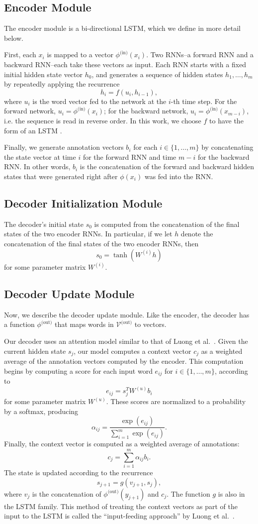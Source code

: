 \documentclass[11pt,letterpaper]{article}
\newcommand{\phiin}{\phi^{\text{(in)}}}
\newcommand{\vocabout}{\mathcal{V}^{\text{(out)}}}
\newcommand{\phiout}{\phi^{\text{(out)}}}
\begin{document}
\subsection{Encoder Module}
The encoder module is a bi-directional LSTM, which we define
in more detail below.

First, each $x_i$ is mapped to a vector $\phiin(x_i)$.
Two RNNs--a forward RNN and a backward RNN--each take these vectors as input.
Each RNN starts with a fixed initial hidden state vector $h_0$, and 
generates a sequence of hidden states $h_1, \dotsc, h_m$ by
repeatedly applying the recurrence \[
  h_i = f(u_i, h_{i-1}),
\]
where $u_i$ is the word vector fed to the network at the $i$-th time step.
For the forward network, $u_i = \phiin(x_i)$; for the
backward network, $u_i = \phiin(x_{m-i})$, i.e. the sequence is read in reverse order.
In this work, we choose $f$ to have the form of an LSTM \cite{hochreiter1997lstm}.

Finally, we generate annotation vectors $b_i$ for each 
$i \in \{1, \dotsc, m\}$ by concatenating the 
state vector at time $i$ for the forward RNN and time $m-i$ 
for the backward RNN.  
In other words, $b_i$ is the concatenation of the forward
and backward hidden states that were generated
right after $\phi(x_i)$ was fed into the RNN.

\subsection{Decoder Initialization Module}
The decoder's initial state $s_0$ is computed from 
the concatenation of the final states of the two encoder RNNs.
In particular, if we let $h$ denote the
concatenation of the final states of the two encoder RNNs, then
\[
  s_0 = \tanh(W^{(i)} h)
\]
for some parameter matrix $W^{(i)}$.

\subsection{Decoder Update Module}
Now, we describe the decoder update module.
Like the encoder, the decoder has a function $\phiout$
that maps words in $\vocabout$ to vectors.

Our decoder uses an attention model similar to that of 
Luong et al.~.
Given the current hidden state $s_j$, our model computes
a context vector $c_j$ as a weighted average of the annotation vectors
computed by the encoder.
This computation begins by computing a score for each input word $e_{ij}$ 
for $i \in \{1, \dotsc, m\}$, according to
\[
  e_{ij} = s_{j}^T W^{(u)} b_i
\]
for some parameter matrix $W^{(u)}$.
These scores are normalized to a probability by a softmax, producing \[
  \alpha_{ij} = \frac{\exp(e_{ij})}{\sum_{i=1}^m \exp(e_{ij})}.
\]
Finally, the context vector is computed as a weighted average of annotations: \[
  c_j = \sum_{i=1}^m \alpha_{ij} b_i.
\]
The state is updated according to the recurrence \[
  s_{j+1} = g(v_{j+1}, s_{j}),
\]
where $v_j$ is the concatenation of $\phiout(y_{j+1})$ and $c_{j}$.
The function $g$ is also in the LSTM family.
This method of treating the context vectors as part of the
input to the LSTM is called the ``input-feeding approach''
by Luong et al.~.
\end{document}
